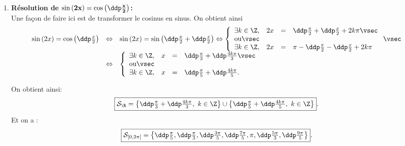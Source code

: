 \begin{correction}
\begin{enumerate}
\begin{minipage}[c]{0.45\textwidth}
\begin{center}
\end{center}
\end{minipage}
\item \textbf{R\'esolution de $\mathbf{\sin{(2x)}=\cos{\left(\ddp\frac{x}{2}\right)}}$:}\\
\noindent Une fa\c{c}on de faire ici est de transformer le cosinus en sinus. On obtient ainsi
$$\begin{array}{lll}\sin{(2x)}=\cos{\left(\ddp\frac{x}{2}\right)} &\Leftrightarrow &\sin{(2x)}=\sin{\left(\ddp\frac{\pi}{2}+\ddp\frac{x}{2}\right)} \Leftrightarrow \left\lbrace\begin{array}{llll}  \exists k\in\Z,& 2x&=& \ddp\frac{\pi}{2}+\ddp\frac{x}{2}+2k\pi\vsec\\ \hbox{ou}\vsec\\ \exists k\in\Z,& 2x&=&\pi-\ddp\frac{\pi}{2}-\ddp\frac{x}{2}+2k\pi    \end{array}\right. \vsec\\
&\Leftrightarrow & \left\lbrace\begin{array}{llll}  \exists k\in\Z,& x&=& \ddp\frac{\pi}{3}+\ddp\frac{4k\pi}{3}\vsec\\ \hbox{ou}\vsec\\ \exists k\in\Z,& x&=& \ddp\frac{\pi}{5}+\ddp\frac{4k\pi}{5}.    \end{array}\right.\end{array}$$
 \begin{minipage}[c]{0.45\textwidth}
On obtient ainsi:
$$\fbox{$\mathcal{S}_{\R}=\left\lbrace  \ddp\frac{\pi}{3}+\ddp\frac{4k\pi}{3} ,\ k\in\Z\right\rbrace\cup\left\lbrace  \ddp\frac{\pi}{5}+\ddp\frac{4k\pi}{5},\ k\in\Z\right\rbrace$}.$$
Et on a :
$$\fbox{$\mathcal{S}_{\lbrack 0,2\pi\lbrack}=\left\lbrace 
\ddp\frac{\pi}{5},\ddp\frac{\pi}{3},\ddp\frac{3\pi}{5},\ddp\frac{7\pi}{5},\pi,\ddp\frac{5\pi}{3},\ddp\frac{9\pi}{5}\right\rbrace$}.$$

\end{minipage}
\end{enumerate}
\end{correction}
